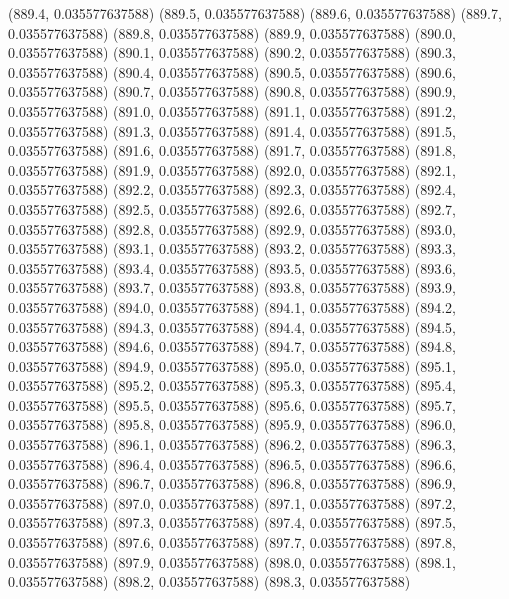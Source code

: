 {					(889.4, 0.035577637588)
					(889.5, 0.035577637588)
					(889.6, 0.035577637588)
					(889.7, 0.035577637588)
					(889.8, 0.035577637588)
					(889.9, 0.035577637588)
					(890.0, 0.035577637588)
					(890.1, 0.035577637588)
					(890.2, 0.035577637588)
					(890.3, 0.035577637588)
					(890.4, 0.035577637588)
					(890.5, 0.035577637588)
					(890.6, 0.035577637588)
					(890.7, 0.035577637588)
					(890.8, 0.035577637588)
					(890.9, 0.035577637588)
					(891.0, 0.035577637588)
					(891.1, 0.035577637588)
					(891.2, 0.035577637588)
					(891.3, 0.035577637588)
					(891.4, 0.035577637588)
					(891.5, 0.035577637588)
					(891.6, 0.035577637588)
					(891.7, 0.035577637588)
					(891.8, 0.035577637588)
					(891.9, 0.035577637588)
					(892.0, 0.035577637588)
					(892.1, 0.035577637588)
					(892.2, 0.035577637588)
					(892.3, 0.035577637588)
					(892.4, 0.035577637588)
					(892.5, 0.035577637588)
					(892.6, 0.035577637588)
					(892.7, 0.035577637588)
					(892.8, 0.035577637588)
					(892.9, 0.035577637588)
					(893.0, 0.035577637588)
					(893.1, 0.035577637588)
					(893.2, 0.035577637588)
					(893.3, 0.035577637588)
					(893.4, 0.035577637588)
					(893.5, 0.035577637588)
					(893.6, 0.035577637588)
					(893.7, 0.035577637588)
					(893.8, 0.035577637588)
					(893.9, 0.035577637588)
					(894.0, 0.035577637588)
					(894.1, 0.035577637588)
					(894.2, 0.035577637588)
					(894.3, 0.035577637588)
					(894.4, 0.035577637588)
					(894.5, 0.035577637588)
					(894.6, 0.035577637588)
					(894.7, 0.035577637588)
					(894.8, 0.035577637588)
					(894.9, 0.035577637588)
					(895.0, 0.035577637588)
					(895.1, 0.035577637588)
					(895.2, 0.035577637588)
					(895.3, 0.035577637588)
					(895.4, 0.035577637588)
					(895.5, 0.035577637588)
					(895.6, 0.035577637588)
					(895.7, 0.035577637588)
					(895.8, 0.035577637588)
					(895.9, 0.035577637588)
					(896.0, 0.035577637588)
					(896.1, 0.035577637588)
					(896.2, 0.035577637588)
					(896.3, 0.035577637588)
					(896.4, 0.035577637588)
					(896.5, 0.035577637588)
					(896.6, 0.035577637588)
					(896.7, 0.035577637588)
					(896.8, 0.035577637588)
					(896.9, 0.035577637588)
					(897.0, 0.035577637588)
					(897.1, 0.035577637588)
					(897.2, 0.035577637588)
					(897.3, 0.035577637588)
					(897.4, 0.035577637588)
					(897.5, 0.035577637588)
					(897.6, 0.035577637588)
					(897.7, 0.035577637588)
					(897.8, 0.035577637588)
					(897.9, 0.035577637588)
					(898.0, 0.035577637588)
					(898.1, 0.035577637588)
					(898.2, 0.035577637588)
					(898.3, 0.035577637588)
}
